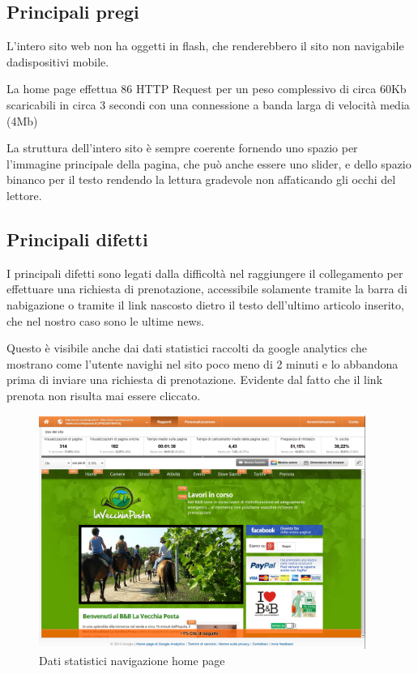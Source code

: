 \documentclass[a4paper,12pt,hidelinks]{report}
\begin{document}
\subsection{Principali pregi}
  L'intero sito web non ha oggetti in flash, che renderebbero il sito non navigabile dadispositivi mobile.
  \par La home page effettua 86 HTTP Request per un peso complessivo di circa 60Kb scaricabili in circa 3 secondi con una connessione a banda larga di velocità media (4Mb)
  \par La struttura dell'intero sito è sempre coerente fornendo uno spazio per l'immagine principale della pagina, che può anche essere uno slider, 
  e dello spazio binanco per il testo rendendo la lettura gradevole non affaticando gli occhi del lettore.

\subsection{Principali difetti}
  I principali difetti sono legati dalla difficoltà nel raggiungere il collegamento per effettuare una richiesta di prenotazione, accessibile 
  solamente tramite la barra di nabigazione o tramite il link nascosto dietro il testo dell'ultimo articolo inserito, che nel nostro caso sono le ultime news.
  \par Questo è visibile anche dai dati statistici raccolti da google analytics che mostrano come l'utente navighi nel sito 
  poco meno di 2 minuti e lo abbandona prima di inviare una richiesta di prenotazione. Evidente dal fatto che il link prenota non risulta mai essere cliccato.
  \begin{figure}[h!]%
    \includegraphics[width=0.95\textwidth,keepaspectratio=true]{img/googleAnalyticsDoc1}
    \centering
    \caption{Dati statistici navigazione home page}%
    \label{fig:googleHomePage}%
  \end{figure}
\end{document}
